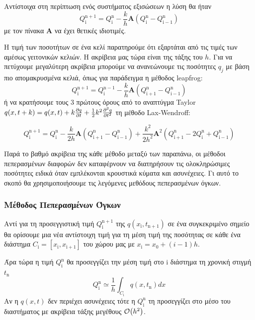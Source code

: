 Αντίστοιχα στη περίπτωση ενός συστήματος εξισώσεων η λύση θα ήταν
\begin{equation}
Q_{\mathrm{i}}^\mathrm{n+1} = Q_{\mathrm{i}}^\mathrm{n} -\frac{k}{h} \mathbf{Α} \left( Q_\mathrm{i}^\mathrm{n} - Q_\mathrm{i-1}^\mathrm{n} \right)
\end{equation} 
με τον πίνακα $\mathbf{Α}$ να έχει θετικές ιδιοτιμές. 

Η τιμή των ποσοτήτων σε ένα κελί παρατηρούμε ότι εξαρτάται από τις τιμές των αμέσως γειτονικών κελιών. Η ακρίβεια μας τώρα είναι της τάξης του $h$. Για να πετύχουμε μεγαλύτερη ακρίβεια μπορούμε να ανανεώνουμε τις ποσότητες $q_j$ με βάση πιο απομακρυσμένα κελιά, όπως για παράδειγμα η μέθοδος leapfrog:
\begin{equation}
Q_{\mathrm{i}}^\mathrm{n+1} = Q_{\mathrm{i}}^\mathrm{n-1} -\frac{k}{h} \mathbf{Α} \left( Q_\mathrm{i+1}^\mathrm{n} - Q_\mathrm{i-1}^\mathrm{n} \right)
\end{equation} 
ή να κρατήσουμε τους 3 πρώτους όρους από το αναπτύγμα Taylor $q(x,t+k)=q(x,t)+k\pdv{q}{t}(x,t)+\frac{1}{2}k^2 \pdv[2]{q}{t}$ τη μέθοδο Lax-Wendroff:
 
 \begin{equation}
 Q_{\mathrm{i}}^\mathrm{n+1} = Q_{\mathrm{i}}^\mathrm{n} -\frac{k}{2h} \mathbf{Α} \left( Q_\mathrm{i+1}^\mathrm{n} - Q_\mathrm{i-1}^\mathrm{n} \right) +\frac{k^2}{2h^2} \mathbf{Α}^2 \left( Q_\mathrm{i+1}^\mathrm{n} - 2Q_{\mathrm{i}}^\mathrm{n}+ Q_\mathrm{i-1}^\mathrm{n} \right)
 \end{equation} 
 
 Παρά το βαθμό ακρίβεια της κάθε μέθοδο μεταξύ των παραπάνω, οι μέθοδοι πεπερασμένων διαφορών δεν καταφέρνουν να διατηρήσουν τις ολοκληρώσιμες ποσότητες ειδικά όταν εμπλέκονται κρουστικά κύματα και ασυνέχειες. Γι αυτό το σκοπό θα χρησιμοποιήσουμε τις λεγόμενες μεθόδους πεπερασμένων όγκων.
 
\subsubsection{Μέθοδος Πεπερασμένων Όγκων}
Αντί για τη προσεγγιστική τιμή $Q_{\mathrm{i}}^\mathrm{n+1}$ της $q(x_\mathrm{i},t_\mathrm{n+1})$ σε ένα συγκεκριμένο σημείο θα ορίσουμε μια νέα αντίστοιχη τιμή για τη μέση τιμή της ποσότητας σε κάθε ένα διάστημα $C_\mathrm{i}=[x_\mathrm{i},x_\mathrm{i+1}]$ του χώρου μας με $x_\mathrm{i}=x_0+(i-1)h$. 

Άρα τώρα η τιμή $Q_{\mathrm{i}}^\mathrm{n}$ θα προσεγγίζει την μέση τιμή στο $\mathrm{i}$ διάστημα τη χρονική στιγμή $t_\mathrm{n}$
\begin{equation}
Q_{\mathrm{i}}^\mathrm{n} \simeq \frac{1}{h} \int _{C_\mathrm{i}} q(x,t_\mathrm{n})dx
\end{equation}
Αν η $q(x,t)$ δεν περιέχει ασυνέχειες τότε η $Q_{\mathrm{i}}^\mathrm{n}$ τη προσεγγίζει στο μέσο του διαστήματος με ακρίβεια τάξης μεγέθους $\order{h^2}$.


